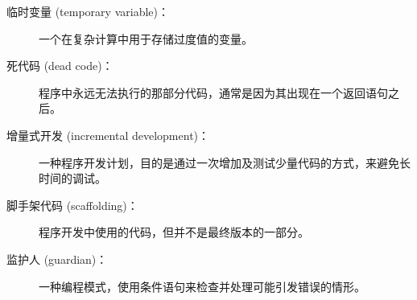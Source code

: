 \begin{description}

  
  

\item[临时变量 (temporary variable)：] 一个在复杂计算中用于存储过度值的变量。


\item[死代码 (dead code)：] 程序中永远无法执行的那部分代码，通常是因为其出现在一个返回语句之后。


\item[增量式开发 (incremental development)：] 一种程序开发计划，目的是通过一次增加及测试少量代码的方式，来避免长时间的调试。


\item[脚手架代码 (scaffolding)：] 程序开发中使用的代码，但并不是最终版本的一部分。

  
  

\item[监护人 (guardian)：] 一种编程模式，使用条件语句来检查并处理可能引发错误的情形。

\end{description}


